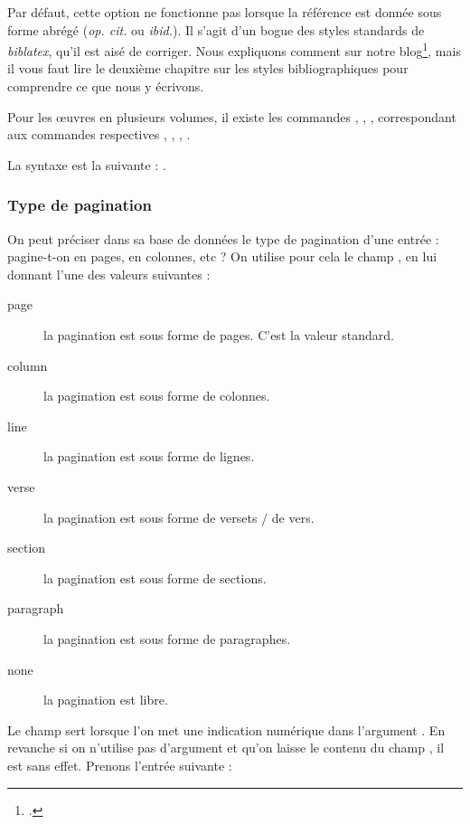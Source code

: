 \begin{attention}
Par défaut, cette option ne fonctionne pas lorsque la référence est donnée sous forme abrégé (\emph{op. cit.} ou \emph{ibid.}). Il s'agit d'un bogue des styles standards de \emph{biblatex}, qu'il est aisé de corriger. Nous expliquons comment sur notre blog\footcite{biblio_bugomit}, mais il vous faut lire le deuxième chapitre sur les styles bibliographiques pour comprendre ce que nous y écrivons. 
\end{attention}

\begin{plusloins}
Pour les œuvres en plusieurs volumes, il existe les commandes , , ,  correspondant aux commandes respectives , , , .

La syntaxe est la suivante : .
\end{plusloins}

\subsubsection{Type de pagination}

On peut préciser dans sa base de données le type de pagination d'une entrée : pagine-t-on en pages, en colonnes, etc ? On utilise  pour cela le champ , en lui donnant l'une des valeurs suivantes : 

\begin{description}
\item[page] la pagination est sous forme de pages. C'est la valeur standard.
\item[column] la pagination est sous forme de colonnes.
\item[line] la pagination est sous forme de lignes.
\item[verse] la pagination est sous forme de versets / de vers. 
\item[section] la pagination est sous forme de sections.
\item[paragraph] la pagination est sous forme de paragraphes.
\item[none] la pagination est libre.
\end{description}

Le champ   sert lorsque l'on met une indication numérique dans l'argument . En revanche si on n'utilise pas d'argument  et qu'on laisse le contenu du champ , il est sans effet. Prenons l'entrée suivante :

